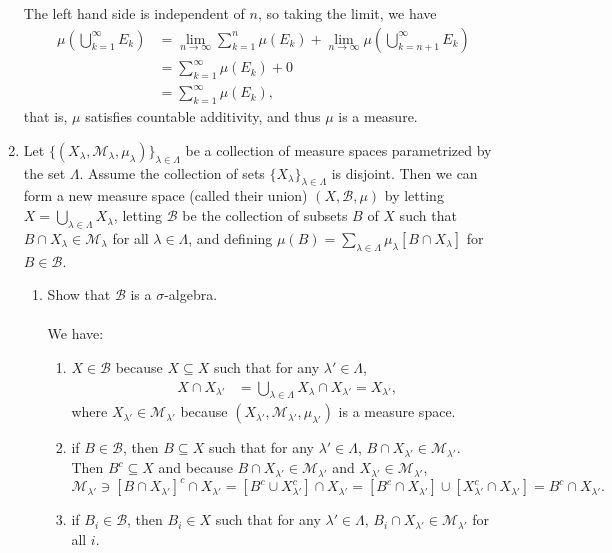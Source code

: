 \begin{enumerate}
	The left hand side is independent of $n$, so taking the limit, we have
	\begin{align*}
		\mu(\bigcup_{k=1}^\infty E_k)&=\lim_{n\to\infty}\sum_{k=1}^n\mu( E_k)+\lim_{n\to\infty}\mu(\bigcup_{k={n+1}}^\infty E_k)\\
		&=\sum_{k=1}^\infty\mu( E_k)+0\\
		&=\sum_{k=1}^\infty\mu( E_k),
	\end{align*}
	that is, $\mu$ satisfies countable additivity, and thus $\mu$ is a measure.
	\item Let $\{(X_\lambda,\mathcal{M}_\lambda,\mu_\lambda)\}_{\lambda\in\Lambda}$ be a collection of measure spaces parametrized by the set $\Lambda$.
	Assume the collection of sets $\{X_\lambda\}_{\lambda\in\Lambda}$ is disjoint.
	Then we can form a new measure space (called their union) $(X,\mathcal{B},\mu)$ by letting $X=\bigcup_{\lambda\in\Lambda}X_\lambda$, letting $\mathcal{B}$ be the collection of subsets $B$ of $X$ such that $B\cap X_\lambda\in\mathcal{M}_\lambda$ for all $\lambda\in\Lambda$, and defining $\mu(B)=\sum_{\lambda\in\Lambda}\mu_\lambda[B\cap X_\lambda]$ for $B\in\mathcal{B}$.
	\begin{enumerate}[label=(\roman*),align=left]   
		\item Show that $\mathcal{B}$ is a $\sigma$-algebra.\\
		\\We have:
		\begin{enumerate}[label=(\roman*),align=left]   
			\item $X\in\mathcal{B}$ because $X\subseteq X$ such that for any $\lambda'\in\Lambda$,
			\begin{align*}
				X\cap X_{\lambda'}&= \bigcup_{\lambda\in\Lambda}X_\lambda\cap X_{\lambda'}= X_{\lambda'},
			\end{align*}
			where $X_{\lambda'}\in\mathcal{M}_{\lambda'}$ because $(X_{\lambda'},\mathcal{M}_{\lambda'},\mu_{\lambda'})$ is a measure space.
			\item if $B\in\mathcal{B}$, then $B\subseteq X$ such that for any $\lambda'\in\Lambda$, $B\cap X_{\lambda'}\in\mathcal{M}_{\lambda'}$.\\
			Then $B^c\subseteq X$ and because $ B\cap X_{\lambda'}\in\mathcal{M}_{\lambda'}$ and $X_{\lambda'}\in\mathcal{M}_{\lambda'}$,
			\[
				\mathcal{M}_{\lambda'}\ni[ B\cap X_{\lambda'}]^c\cap X_{\lambda'}=[B^c\cup X_{\lambda'}^c]\cap X_{\lambda'}=[B^c\cap X_{\lambda'}]\cup[X_{\lambda'}^c\cap X_{\lambda'}]=B^c\cap X_{\lambda'}.
			\]
			\item if $B_i\in\mathcal{B}$, then $B_i\in X$ such that for any $\lambda'\in\Lambda$, $B_i\cap X_{\lambda'}\in\mathcal{M}_{\lambda'}$ for all $i$.\\

\end{enumerate}
\end{enumerate}
\end{enumerate}
